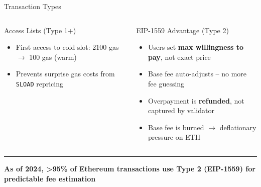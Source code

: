 \documentclass[8pt,aspectratio=169]{beamer}
\newcommand{\bottomnote}[1]{\vfill\vspace{-2mm}\textcolor{mllavender2}{\rule{\textwidth}{0.4pt}}\vspace{1mm}\footnotesize\textbf{#1}}
\begin{document}
\begin{frame}{Transaction Types}
\begin{columns}
\begin{block}{Access Lists (Type 1+)}
\begin{itemize}
  \item First access to cold slot: 2100 gas $\to$ 100 gas (warm)
  \item Prevents surprise gas costs from \texttt{SLOAD} repricing
\end{itemize}
\end{block}
\begin{block}{EIP-1559 Advantage (Type 2)}
\begin{itemize}\small
  \item Users set \textbf{max willingness to pay}, not exact price
  \item Base fee auto-adjusts -- no more fee guessing
  \item Overpayment is \textbf{refunded}, not captured by validator
  \item Base fee is burned $\to$ deflationary pressure on ETH
\end{itemize}
\end{block}
\end{columns}
\bottomnote{As of 2024, >95\% of Ethereum transactions use Type 2 (EIP-1559) for predictable fee estimation}
\end{frame}
\end{document}
